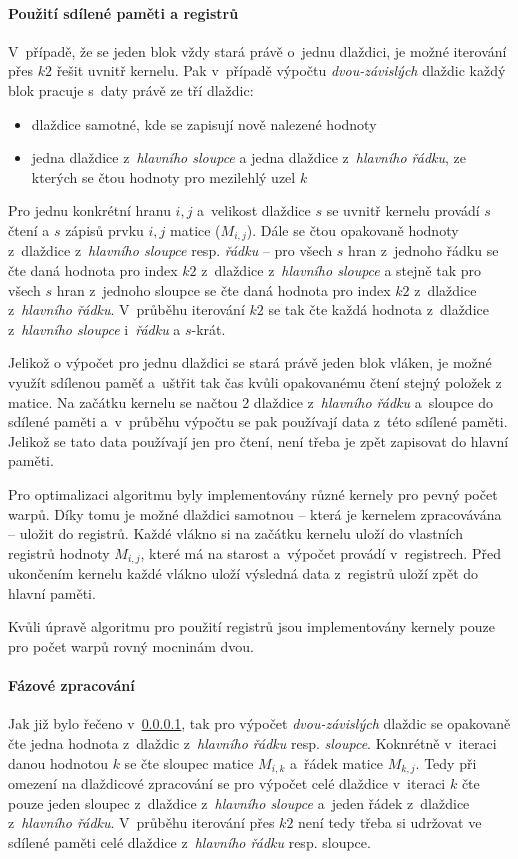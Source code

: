 \paragraph{Použití sdílené paměti a registrů}\label{cuda:sdilena}
V~případě, že se jeden blok vždy stará právě o~jednu dlaždici, je možné iterování přes $k2$ řešit uvnitř kernelu. 
Pak v~případě výpočtu \emph{dvou-závislých} dlaždic každý blok pracuje s~daty právě ze tří dlaždic:
\begin{itemize}
    \item dlaždice samotné, kde se zapisují nově nalezené hodnoty
    \item jedna dlaždice z~\emph{hlavního sloupce} a jedna dlaždice z~\emph{hlavního řádku}, ze kterých se čtou hodnoty
        pro mezilehlý uzel $k$
\end{itemize}

Pro jednu konkrétní hranu $i,j$ a~velikost dlaždice $s$ se uvnitř kernelu provádí $s$ čtení a $s$ zápisů prvku $i,j$ matice ($M_{i,j}$).
Dále se čtou opakovaně hodnoty z~dlaždice z~\emph{hlavního sloupce} resp. \emph{řádku} -- pro všech $s$ hran z~jednoho řádku se čte
daná hodnota pro index $k2$ z~dlaždice z~\emph{hlavního sloupce} a stejně tak pro všech $s$ hran z~jednoho sloupce se čte daná hodnota
pro index $k2$ z~dlaždice z~\emph{hlavního řádku}. V~průběhu iterování $k2$ se tak čte každá hodnota z~dlaždice z~\emph{hlavního sloupce} 
i~\emph{řádku} a $s$-krát.

Jelikož o výpočet pro jednu dlaždici se stará právě jeden blok vláken, je možné využít sdílenou paměť a~uštřit tak čas kvůli opakovanému 
čtení stejný položek z matice. Na začátku kernelu se načtou 2 dlaždice z~\emph{hlavního řádku} a~sloupce do sdílené paměti a~v~průběhu 
výpočtu se pak používají data z~této sdílené paměti. Jelikož se tato data používají jen pro čtení, není třeba je zpět zapisovat do 
hlavní paměti.

Pro optimalizaci algoritmu byly implementovány různé kernely pro pevný počet warpů. Díky tomu je možné dlaždici samotnou -- která je 
kernelem zpracovávána -- uložit do registrů. Každé vlákno si na začátku kernelu uloží do vlastních registrů hodnoty $M_{i,j}$, které
má na starost a~výpočet provádí v~registrech. Před ukončením kernelu každé vlákno uloží výsledná data z~registrů uloží zpět do hlavní 
paměti.

Kvůli úpravě algoritmu pro použití registrů jsou implementovány kernely pouze pro počet warpů rovný mocninám dvou.

\paragraph{Fázové zpracování}
Jak již bylo řečeno v~\ref{cuda:sdilena}, tak pro výpočet \emph{dvou-závislých} dlaždic se opakovaně čte jedna hodnota z~dlaždic 
z~\emph{hlavního řádku} resp. \emph{sloupce}. Koknrétně v~iteraci danou hodnotou $k$ se čte sloupec matice $M_{i,k}$ a~řádek matice
$M_{k,j}$. Tedy při omezení na dlaždicové zpracování se pro výpočet celé dlaždice v~iteraci $k$ čte pouze jeden sloupec z~dlaždice
z~\emph{hlavního sloupce} a~jeden řádek z~dlaždice z~\emph{hlavního řádku}. V~průběhu iterování přes $k2$ není tedy třeba si udržovat 
ve sdílené paměti celé dlaždice z~\emph{hlavního řádku} resp. sloupce.

